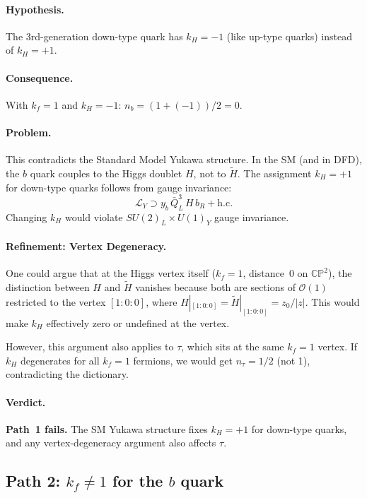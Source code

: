 \documentclass[11pt,a4paper]{article}
\newcommand{\CP}{\mathbb{CP}}
\theoremstyle{definition}
\theoremstyle{remark}
\begin{document}
\paragraph{Hypothesis.}  The 3rd-generation down-type quark has $k_H = -1$
(like up-type quarks) instead of $k_H = +1$.

\paragraph{Consequence.}  With $k_f = 1$ and $k_H = -1$:
$n_b = (1 + (-1))/2 = 0$.  \checkmark

\paragraph{Problem.}  This contradicts the Standard Model Yukawa structure.
In the SM (and in DFD), the $b$ quark couples to the Higgs doublet $H$,
not to $\tilde{H}$.  The assignment $k_H = +1$ for down-type quarks
follows from gauge invariance:
\[
\mathcal{L}_Y \supset y_b\,\bar{Q}_L^3\,H\,b_R + \text{h.c.}
\]
Changing $k_H$ would violate $SU(2)_L \times U(1)_Y$ gauge invariance.

\paragraph{Refinement: Vertex Degeneracy.}  One could argue that at the
Higgs vertex itself ($k_f = 1$, distance~0 on $\CP^2$), the distinction
between $H$ and $\tilde{H}$ vanishes because both are sections of
$\mathcal{O}(1)$ restricted to the vertex $[1:0:0]$, where
$H|_{[1:0:0]} = \tilde{H}|_{[1:0:0]} = z_0/|z|$.  This would make
$k_H$ effectively zero or undefined at the vertex.

However, this argument also applies to $\tau$, which sits at the same
$k_f = 1$ vertex.  If $k_H$ degenerates for all $k_f = 1$ fermions,
we would get $n_\tau = 1/2$ (not 1), contradicting the dictionary.

\paragraph{Verdict.}  \textbf{Path~1 fails.}  The SM Yukawa structure
fixes $k_H = +1$ for down-type quarks, and any vertex-degeneracy argument
also affects $\tau$.

\subsection{Path 2: $k_f \neq 1$ for the $b$ quark}
\label{sec:path2}
\end{document}
